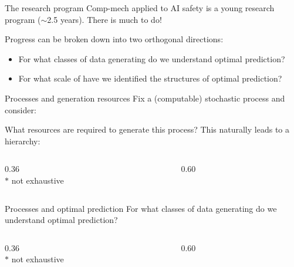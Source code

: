 \documentclass[aspectratio=169,12pt,t]{beamer}
\begin{document}
\begin{frame}{The research program}
  Comp-mech applied to AI safety is a young research program
  ($\sim$2.5 years). There is much to do!

  Progress can be broken down into two orthogonal directions:
  \vspace{2mm}

  \begin{itemize}
    \setlength{\itemsep}{3mm}
    \item For what classes of data generating  do we
      understand optimal prediction?
    \item For what scale of  have we identified the
      structures of optimal prediction?
  \end{itemize}
\end{frame}

\begin{frame}{Processes and generation resources}
  Fix a (computable) stochastic process and consider:

  What resources are required to generate this process? This naturally leads
  to a hierarchy:
  \begin{columns}[T,onlytextwidth]
    \begin{column}{0.36\textwidth}
      \centering\resizebox{!}{38mm}{}\\[1mm]
      {\footnotesize $*$ not exhaustive}
    \end{column}
    \begin{column}{0.60\textwidth}
      \vspace{4mm}
      {\small}
    \end{column}
  \end{columns}
\end{frame}

\begin{frame}{Processes and optimal prediction}
  For what classes of data generating  do we understand
  optimal prediction?
  \begin{columns}[T,onlytextwidth]
    \begin{column}{0.36\textwidth}
      \centering\resizebox{!}{42mm}{}\\[1mm]
      {\footnotesize $*$ not exhaustive}
    \end{column}
    \begin{column}{0.60\textwidth}
      \vspace{4mm}
      {\small}
    \end{column}
  \end{columns}
\end{frame}
\end{document}

